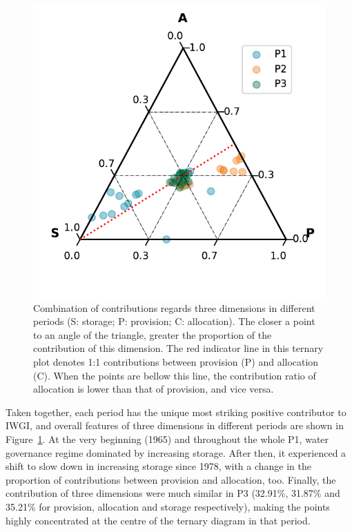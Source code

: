 \documentclass[9pt, twocolumn, twoside, lineno]{pnas-new}
\begin{document}
\begin{figure}[!htbp]
	\centering
	\includegraphics[width=0.9\linewidth]{../../figures/main/phases.pdf}
	\caption{Combination of contributions regards three dimensions in different periods (S: storage; P: provision; C: allocation). The closer a point to an angle of the triangle, greater the proportion of the contribution of this dimension.
	The red indicator line in this ternary plot denotes 1:1 contributions between provision (P) and allocation (C). When the points are bellow this line, the contribution ratio of allocation is lower than that of provision, and vice versa.}
	\label{fig:phases}
\end{figure}

Taken together, each period has the unique most striking positive contributor to IWGI, and overall features of three dimensions in different periods are shown in Figure~\ref{fig:phases}.
At the very beginning (1965) and throughout the whole P1, water governance regime dominated by increasing storage. After then, it experienced a shift to slow down in increasing storage since 1978, with a change in the proportion of contributions between provision and allocation, too.
Finally, the contribution of three dimensions were much similar in P3 (32.91\%, 31.87\% and 35.21\% for provision, allocation and storage respectively), making the points highly concentrated at the centre of the ternary diagram in that period.
\end{document}
